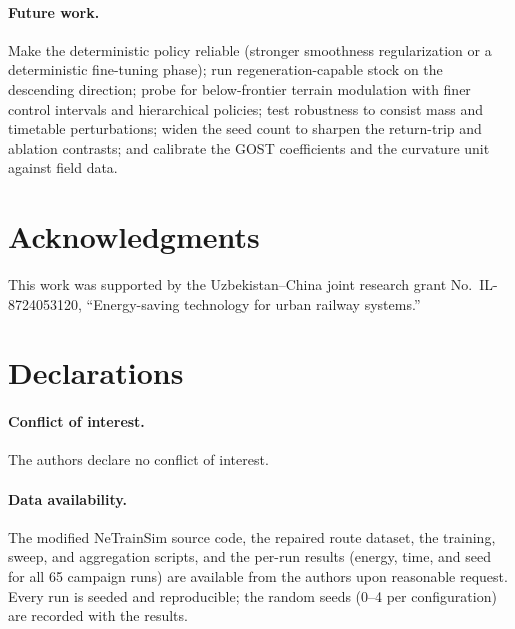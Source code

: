 \documentclass[11pt,a4paper]{article}
\begin{document}
\paragraph{Future work.} Make the deterministic policy reliable (stronger
smoothness regularization or a deterministic fine-tuning phase); run
regeneration-capable stock on the descending direction; probe for
below-frontier terrain modulation with finer control intervals and
hierarchical policies; test robustness to consist mass and timetable
perturbations; widen the seed count to sharpen the return-trip and ablation
contrasts; and calibrate the GOST coefficients and the curvature unit
against field data.

\section*{Acknowledgments}
This work was supported by the Uzbekistan--China joint research grant
No.~IL-8724053120, ``Energy-saving technology for urban railway systems.''

\section*{Declarations}
\paragraph{Conflict of interest.} The authors declare no conflict of
interest.
\paragraph{Data availability.} The modified NeTrainSim source code, the
repaired route dataset, the training, sweep, and aggregation scripts, and
the per-run results (energy, time, and seed for all 65 campaign runs) are
available from the authors upon reasonable request. Every run is seeded and
reproducible; the random seeds (0--4 per configuration) are recorded with
the results.
\end{document}

